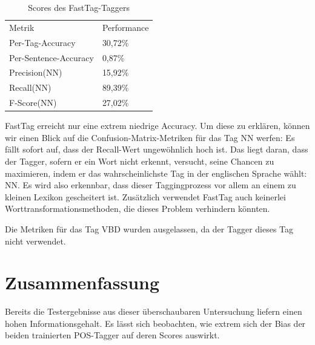 \begin{table}[htb]
\centering
\captionsetup{justification=centering,margin=2cm}
\begin{tabular}{l|l}
Metrik & Performance \\
\cline{1-2}
Per-Tag-Accuracy & 30,72\% \\
Per-Sentence-Accuracy & 0,87\%\\
\cline{1-2}
Precision(NN) & 15,92\%\\
Recall(NN) & 89,39\%\\
F-Score(NN) & 27,02\%\\


\end{tabular}
\vspace{3mm}
\caption{Scores des FastTag-Taggers}
\label{tab:eval:detail:fasttag}
\end{table}

FastTag erreicht nur eine extrem niedrige Accuracy. Um diese zu erklären, können wir einen Blick auf die Confusion-Matrix-Metriken für das Tag NN werfen: Es fällt sofort auf, dass der Recall-Wert ungewöhnlich hoch ist. Das liegt daran, dass der Tagger, sofern er ein Wort nicht erkennt, versucht, seine Chancen zu maximieren, indem er das wahrscheinlichste Tag in der englischen Sprache wählt: \textsc{NN}. Es wird also erkennbar, dass dieser Taggingprozess vor allem an einem zu kleinen Lexikon gescheitert ist. Zusätzlich verwendet FastTag auch keinerlei Worttransformationsmethoden, die dieses Problem verhindern könnten.

Die Metriken für das Tag \textsc{VBD} wurden ausgelassen, da der Tagger dieses Tag nicht verwendet.

\section{Zusammenfassung}
\label{sec:eval:conclusion}

Bereits die Testergebnisse aus dieser überschaubaren Untersuchung liefern einen hohen Informationsgehalt. Es lässt sich beobachten, wie extrem sich der Bias der beiden trainierten POS-Tagger auf deren Scores auswirkt.

